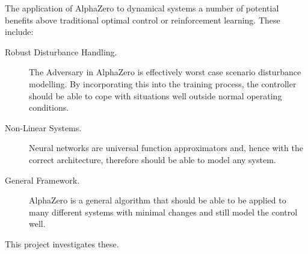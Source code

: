 \documentclass[../main.tex]{subfiles}
\begin{document}
The application of AlphaZero to dynamical systems a number of potential benefits above traditional optimal control or reinforcement learning. These include:
\begin{description}
    \item[Robust Disturbance Handling.] The Adversary in AlphaZero is effectively worst case scenario disturbance modelling. By incorporating this into the training process, the controller should be able to cope with situations well outside normal operating conditions.
    \item[Non-Linear Systems.] Neural networks are universal function approximators and, hence with the correct architecture, therefore should be able to model any system.
    \item[General Framework.] AlphaZero is a general algorithm that should be able to be applied to many different systems with minimal changes and still model the control well. 
\end{description}

This project investigates these.

\onlyinsubfile{}
\end{document}
